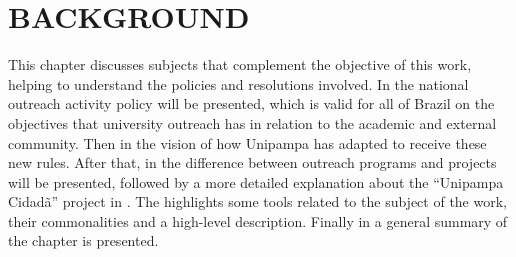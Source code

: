 
\chapter{BACKGROUND}\label{background}


This chapter discusses subjects that complement the objective of this work, helping to understand the policies and resolutions involved.
In  the national outreach activity policy will be presented, which is valid for all of Brazil on the objectives that university outreach has in relation to the academic and external community.
Then in  the vision of how Unipampa has adapted to receive these new rules.
After that, in  the difference between outreach programs and projects will be presented, followed by a more detailed explanation about the ``Unipampa Cidadã'' project in .
The  highlights some tools related to the subject of the work, their commonalities and a high-level description.
Finally in  a general summary of the chapter is presented.


